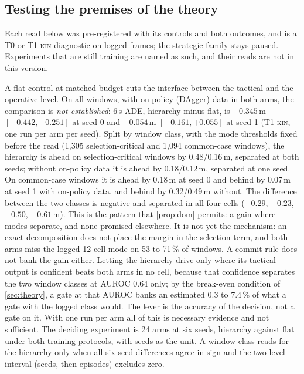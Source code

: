 \documentclass[10pt,twocolumn]{article}
\makeatletter
\theoremstyle{remark}
\newcommand{\tier}[1]{\textsc{\small #1}}
\renewcommand\paragraph{\@startsection{paragraph}{4}{\z@}{1.6ex \@plus .5ex \@minus .2ex}{-1em}{\normalfont\normalsize\bfseries}}
\makeatother
\begin{document}
\subsection{Testing the premises of the theory}\label{sec:premises}
Each read below was pre-registered with its controls and both outcomes, and is a \tier{T0} or \tier{T1-kin} diagnostic on logged
frames; the strategic family stays paused. Experiments that are still training are named as such, and their reads are not in this version.

\paragraph{Hierarchy against a flat control (T2).} A flat control at matched budget cuts the interface between the tactical and the
operative level. On all windows, with on-policy (DAgger) data in both arms, the comparison is \emph{not established}: 6\,s ADE,
hierarchy minus flat, is $-0.345$\,m $[-0.442,-0.251]$ at seed 0 and $-0.054$\,m $[-0.161,+0.055]$ at seed 1 (\tier{T1-kin}, one run
per arm per seed). Split by window class, with the mode thresholds fixed before the read (1,305 selection-critical and 1,094
common-case windows), the hierarchy is ahead on selection-critical windows by 0.48/0.16\,m, separated at both seeds; without
on-policy data it is ahead by 0.18/0.12\,m, separated at one seed. On common-case windows it is ahead by 0.18\,m at seed 0 and behind
by 0.07\,m at seed 1 with on-policy data, and behind by 0.32/0.49\,m without. The difference between the two classes is negative and
separated in all four cells ($-0.29$, $-0.23$, $-0.50$, $-0.61$\,m). This is the pattern that \cref{prop:dom} permits: a gain where
modes separate, and none promised elsewhere. It is not yet the mechanism: an exact decomposition does not place the margin in the
selection term, and both arms miss the logged 12-cell mode on 53 to 71\,\% of windows. A commit rule does not bank the gain either.
Letting the hierarchy drive only where its tactical output is confident beats both arms in no cell, because that confidence
separates the two window classes at AUROC 0.64 only; by the break-even condition of \cref{sec:theory}, a gate at that AUROC banks an
estimated 0.3 to 7.4\,\% of what a gate with the logged class would. The lever is the accuracy of the decision, not a gate on it.
With one run per arm all of this is necessary evidence and not sufficient. The deciding experiment is 24 arms at six seeds, hierarchy against flat under both training protocols,
with seeds as the unit. A window class
reads for the hierarchy only when all six seed differences agree in sign and the two-level interval (seeds, then episodes) excludes zero.
\end{document}
